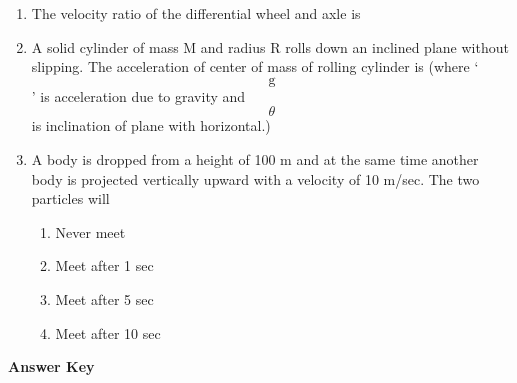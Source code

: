 \documentclass[11pt,a4paper]{article}
\begin{document}
\begin{enumerate}
\item{The velocity ratio of the differential wheel and axle is}
\\
\item{A solid cylinder of mass M and radius R rolls down an inclined plane without slipping. The acceleration of center of mass of rolling cylinder is (where `$${\text{g}}$$' is acceleration due to gravity and $$\theta $$ is inclination of plane with horizontal.)
}
\\
\item{A body is dropped from a height of 100 m and at the same time another body is projected vertically upward with a velocity of 10 m/sec. The two particles will}
\begin{enumerate}[label=\Alph*.]
\item{Never meet}
\item{Meet after 1 sec}
\item{Meet after 5 sec}
\item{Meet after 10 sec}
\end{enumerate}
\end{enumerate}
\textbf{Answer Key}
\end{document}
